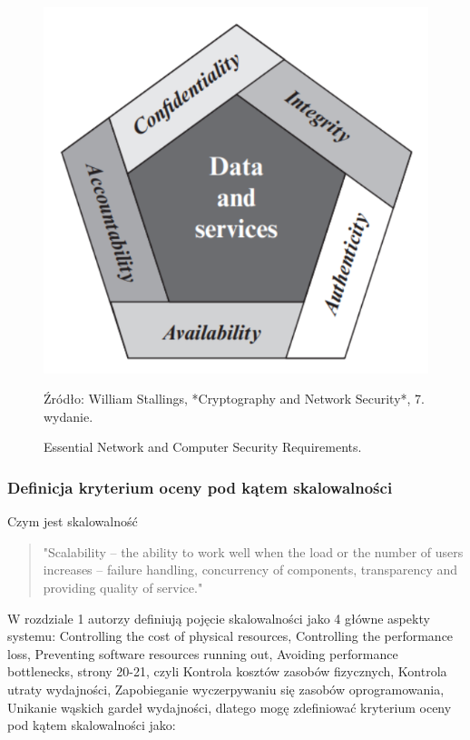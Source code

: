 \documentclass[runningheads,12pt]{llncs}
\begin{document}
\begin{figure}
    \includegraphics[width=\linewidth]{images/image-security.png}
    \caption{Essential Network and Computer Security Requirements.} \label{fig1}
    \vspace{0.5em}
    \begin{center}
        {\small Źródło: William Stallings, *Cryptography and Network Security*, 7. wydanie.}
    \end{center}
\end{figure}

\subsubsection{Definicja kryterium oceny pod kątem skalowalności}

Czym jest skalowalność 

\begin{quote}
    "Scalability – the ability to work well when the load or the number of users increases – failure handling, concurrency of components, transparency and providing quality of service." ~\cite[p. 21]{coulouris2011distributed}
\end{quote}

W rozdziale 1 autorzy definiują pojęcie skalowalności jako 4 główne aspekty systemu: Controlling the cost of physical resources, Controlling the performance loss, Preventing software resources running out, Avoiding performance bottlenecks, strony 20-21, czyli Kontrola kosztów zasobów fizycznych, Kontrola utraty wydajności, Zapobieganie wyczerpywaniu się zasobów oprogramowania, Unikanie wąskich gardeł wydajności, dlatego mogę zdefiniować kryterium oceny pod kątem skalowalności jako:
\end{document}
